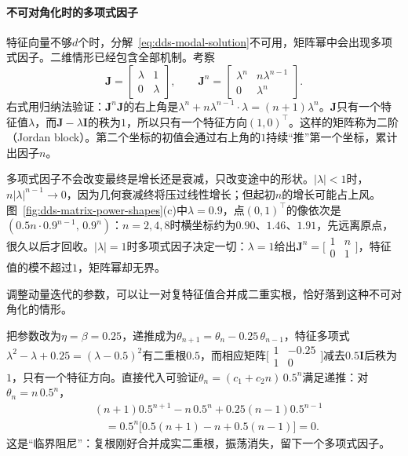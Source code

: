 \paragraph{不可对角化时的多项式因子}
特征向量不够$d$个时，分解~\eqref{eq:dds-modal-solution}不可用，矩阵幂中会出现多项式因子。二维情形已经包含全部机制。考察
\[
  \bm J=\begin{bmatrix}\lambda&1\\0&\lambda\end{bmatrix},\qquad
  \bm J^n=\begin{bmatrix}\lambda^n&n\lambda^{n-1}\\0&\lambda^n\end{bmatrix}.
\]
右式用归纳法验证：$\bm J^n\bm J$的右上角是$\lambda^n+n\lambda^{n-1}\cdot\lambda=(n+1)\lambda^n$。$\bm J$只有一个特征值$\lambda$，而$\bm J-\lambda\bm I$的秩为$1$，所以只有一个特征方向$(1,0)^{\top}$。这样的矩阵称为二阶（Jordan block）。第二个坐标的初值会通过右上角的$1$持续“推”第一个坐标，累计出因子$n$。

多项式因子不会改变最终是增长还是衰减，只改变途中的形状。$|\lambda|<1$时，$n|\lambda|^{n-1}\to0$，因为几何衰减终将压过线性增长；但起初$n$的增长可能占上风。图~\ref{fig:dds-matrix-power-shapes}(c)中$\lambda=0.9$，点$(0,1)^{\top}$的像依次是$(0.5n\cdot0.9^{n-1},\,0.9^n)$：$n=2,4,8$时横坐标约为$0.90$、$1.46$、$1.91$，先远离原点，很久以后才回收。$|\lambda|=1$时多项式因子决定一切：$\lambda=1$给出$\bm J^n=\bigl[\begin{smallmatrix}1&n\\0&1\end{smallmatrix}\bigr]$，特征值的模不超过$1$，矩阵幂却无界。

调整动量迭代的参数，可以让一对复特征值合并成二重实根，恰好落到这种不可对角化的情形。

\begin{example}[临界阻尼的动量迭代]
\label{ex:dds-critical-damping}
把参数改为$\eta=\beta=0.25$，递推成为$\theta_{n+1}=\theta_n-0.25\,\theta_{n-1}$，特征多项式$\lambda^2-\lambda+0.25=(\lambda-0.5)^2$有二重根$0.5$，而相应矩阵$\bigl[\begin{smallmatrix}1&-0.25\\1&0\end{smallmatrix}\bigr]$减去$0.5\bm I$后秩为$1$，只有一个特征方向。直接代入可验证$\theta_n=(c_1+c_2n)\,0.5^n$满足递推：对$\theta_n=n\,0.5^n$，
\[
  \begin{aligned}
  &(n+1)0.5^{n+1}-n\,0.5^n+0.25(n-1)0.5^{n-1}\\
  &\quad=0.5^n\bigl[0.5(n+1)-n+0.5(n-1)\bigr]=0 .
  \end{aligned}
\]
这是“临界阻尼”：复根刚好合并成实二重根，振荡消失，留下一个多项式因子。
\end{example}

